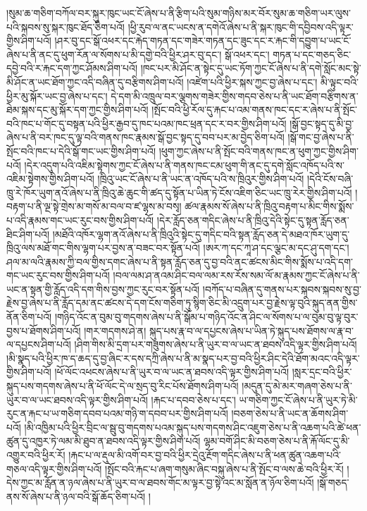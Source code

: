 །སུམ་ཆ་གཅིག་བཀོལ་བར་སྐུར་ཁུང་ཡང་ངོ་ཞེས་པ་ནི་རྩིག་པའི་སུམ་གཉིས་མར་བོར་སུམ་ཆ་གཅིག་ཡར་ལུས་པའི་སྐབས་སུ་སྐར་ཁུང་ཐོད་ཅིག་པའོ། །ཕྱི་རུབ་ལ་ནང་ཡངས་ན་དགེའོ་ཞེས་པ་ནི་སྐར་ཁུང་གི་དབྱིབས་འདི་ལྟར་གྱིས་ཤིག་པའོ། །ཤར་བུ་དང་སྒོ་འཕར་དང་རྐེད་གཏན་དང་གཟེར་གཏན་དང་ཟུང་དང་ར་རྐང་གི་དབྱུག་པ་ཡང་ངོ་ཞེས་པ་ནི་ནང་དུ་ཕུག་རོན་ལ་སོགས་པ་མི་དགྱེ་བའི་ཕྱིར་ཤར་བུ་དང་། སྒོ་འཕར་དང་། གཏན་པ་དང་གཅད་ཅིང་དབྱེ་བའི་ར་རྐང་དག་ཀྱང་ཤོམས་ཤིག་པའོ། །ཁང་པར་མི་ཤོང་ན་སྟེང་དུ་ཡང་ཏོག་ཀྱང་ངོ་ཞེས་པ་ནི་དགེ་སློང་མང་སྟེ་མི་ཤོང་ན་ཡང་ཐོག་ཀྱང་འདི་བཞིན་དུ་བརྩིགས་ཤིག་པའོ། །འཛེག་པའི་ཕྱིར་སྐས་ཀྱང་བྱ་ཞེས་པ་དང་། མི་ལྟུང་བའི་ཕྱིར་མུ་སྐོར་ཡང་བྱ་ཞེས་པ་དང་། དེ་དག་མི་འཁྲུལ་བར་ལྕགས་གཟེར་གྱིས་གདབ་ཅེས་པ་ནི་ཡང་ཐོག་བརྩིགས་ན་ཐེམ་སྐས་དང་མུ་སྐོར་དག་ཀྱང་གྱིས་ཤིག་པའོ། །སྤོང་བའི་ཕྱི་རོལ་དུ་རྐང་པ་འམ་གནས་ཁང་དང་ར་ཞེས་པ་ནི་སྤོང་བའི་ཁང་པ་གོང་དུ་བསྟན་པའི་ཕྱིར་རྒྱབ་དུ་ཁང་པའམ་ཁང་ཕྲན་དང་ར་བར་གྱིས་ཤིག་པའོ། །སྒོ་བྱང་སྟད་དུ་མི་བྱ་ཞེས་པ་ནི་བར་ཁང་དུ་ལྟ་བའི་གནས་ཁང་རྣམས་སྒོ་བྱང་སྟད་དུ་བབ་པར་མ་བྱེད་ཅིག་པའོ། །སྒོ་གང་བྱ་ཞེས་པ་ནི་སྤོང་བའི་ཁང་པ་དེའི་སྒོ་གང་ཡང་གྱིས་ཤིག་པའོ། །ཕུག་ཀྱང་ཞེས་པ་ནི་སྤོང་བའི་གནས་ཁང་ན་ཕུག་ཀྱང་གྱིས་ཤིག་པའོ། །དེར་འདུག་པའི་འཇིམ་སྟེགས་ཀྱང་ངོ་ཞེས་པ་ནི་གནས་ཁང་ངམ་ཕུག་གི་ནང་དུ་དགེ་སློང་འཁོད་པའི་ས་འཇིམ་སྟེགས་གྱིས་ཤིག་པའོ། །ཁྲིའུ་ཡང་ངོ་ཞེས་པ་ནི་ཡང་ན་འཁོད་པའི་ས་ཁྲིའུར་གྱིས་ཤིག་པའོ། །དེའི་ངོས་བཞི་ཁྲུ་རེ་ཁོར་ཡུག་ནའོ་ཞེས་པ་ནི་ཁྲིའུ་ཆེ་ཆུང་གི་ཚད་དུ་སྟོན་པ་ཡིན་ཏེ་ངོས་འཇིག་ཅིང་ཡང་ཁྲུ་རེར་གྱིས་ཤིག་པའོ། །བརྟག་པ་ནི་ལྔ་སྟེ་གྲེས་མ་གསོ་མ་བལ་བ་ཛ་ལྷས་མ་བསྭ། ཚལ་རྣམས་སོ་ཞེས་པ་ནི་ཁྲིའུ་བརྟག་པ་མིང་གིས་སྨོས་པ་འདི་རྣམས་གང་ཡང་རུང་བས་གྱིས་ཤིག་པའོ། །དེར་རློད་ཅན་གདིང་ཞེས་པ་ནི་ཁྲིའུ་དེའི་སྟེང་དུ་སྟན་རློད་ཅན་ཐིང་ཤིག་པའོ། །མཐོའི་འཁོར་ལྷག་ནའོ་ཞེས་པ་ནི་ཁྲིའུའི་སྟེང་དུ་གདིང་བའི་སྟན་རློད་ཅན་དེ་མཐའ་ཁོར་ཡུག་དུ་ཁྲིའུ་ལས་མཐོ་གང་གིས་ལྷག་པར་བྱས་ན་བཟང་བར་སྟོན་པའོ། །ཨར་ཀ་དང་ཀཱ་ཤ་དང་ལྕང་མ་དང་ཤུ་དག་དང་། ཤལ་མ་ལའི་རྣམས་ཀྱི་བལ་གྱིས་དགང་ཞེས་པ་ནི་སྟན་རློད་ཅན་དུ་བྱ་བའི་ནང་ཚངས་མིང་གིས་སྨོས་པ་འདི་དག་གང་ཡང་རུང་བས་གྱིས་ཤིག་པའོ། །བལ་ལམ་ཤ་ནའམ་ཤིང་བལ་ལམ་རས་རོས་སམ་ལོ་མ་རྣམས་ཀྱང་ངོ་ཞེས་པ་ནི་ཡང་ན་སྟན་གྱི་རློད་འདི་དག་གིས་བྱས་ཀྱང་རུང་བར་སྟོན་པའོ། །བཀོད་པ་བཞིན་དུ་གནས་པར་སྐབས་སྐབས་སུ་བྱ་རྗེས་བྱ་ཞེས་པ་ནི་རློད་དམ་ནང་ཚངས་དེ་དག་ངོས་གཅིག་ཏུ་སྙིག་ཅིང་མི་འདྲུག་པར་བྱ་རྗེས་ལྟ་བུའི་སྐུད་ནན་གྱིས་ནོན་ཅིག་པའོ། །གཉིད་འོང་ན་བུམ་བུ་གདགས་ཞེས་པ་ནི་སྒོམ་པ་གཉིད་འོང་ན་ཤིང་ལ་སོགས་པ་ལ་བུམ་བུ་ལྟ་བུར་བྱས་པ་ཐོགས་ཤིག་པའོ། །གར་གདགས་ཤེ་ན། སྐུད་པས་རྣ་བ་ལ་དཔྱངས་ཞེས་པ་ཡིན་ཏེ་སྐུད་པས་ཐོགས་ལ་རྣ་བ་ལ་དཔྱངས་ཤིག་པའོ། །ཤིག་གིས་མི་དྲག་པར་གཟུགས་ཞེས་པ་ནི་ཡུར་བ་ལ་ཡང་ན་ཐབས་འདི་ལྟར་གྱིས་ཤིག་པའོ། །མི་སྣད་པའི་ཕྱིར་ཁ་ད་ཆད་དུ་བྱ་ཞིང་ར་དས་དཀྲི་ཞེས་པ་ནི་མ་སྣད་པར་བྱ་བའི་ཕྱིར་ཤིང་དེའི་ཐོག་མའང་འདི་ལྟར་གྱིས་ཤིག་པའོ། །ཕོ་ལོང་འཕངས་ཞེས་པ་ནི་ཡུར་བ་ལ་ཡང་ན་ཐབས་འདི་ལྟར་གྱིས་ཤིག་པའོ། །སླར་དྲང་བའི་ཕྱིར་སྐུད་པས་གདགས་ཞེས་པ་ནི་ཕོ་ལོང་དེ་ལ་སྲད་བུ་རིང་པོས་ཐོགས་ཤིག་པའོ། །མདུན་དུ་མེ་མར་གཞག་ཅེས་པ་ནི་ཡུར་བ་ལ་ཡང་ཐབས་འདི་ལྟར་གྱིས་ཤིག་པའོ། །རྐང་པ་དབབ་ཅེས་པ་དང་། ཡ་གཅིག་ཀྱང་ངོ་ཞེས་པ་ནི་ཡུར་ཏེ་མི་རུང་ན་རྐང་པ་ཡ་གཅིག་དབབ་པའམ་གཉི་ག་དབབ་པར་གྱིས་ཤིག་པའོ། །བཅག་ཅེས་པ་ནི་ཡང་ན་ཆོགས་ཤིག་པའོ། །མི་འཁྱིམ་པའི་ཕྱིར་བྲིང་ལ་སྦུ་བུ་གདགས་པའམ་སྐུད་པས་གདགས་ཤིང་འཇུག་ཅེས་པ་ནི་འཆག་པའི་ཚེ་ཕན་ཚུན་དུ་འཁྱར་ཏེ་ལམ་མི་ཐུབ་ན་ཐབས་འདི་ལྟར་གྱིས་ཤིག་པའོ། ལྷམ་བགོ་ཤིང་མི་བཅག་ཅེས་པ་ནི་རྐོ་ལོང་དུ་མི་འགྱུར་བའི་ཕྱིར་རོ། །རྐང་པ་ལ་རྡུལ་མི་འགོ་བར་བྱ་བའི་ཕྱིར་དྲེའུ་རྔོག་གདིང་ཞེས་པ་ནི་ཕན་ཚུན་འཆག་པའི་གཅལ་འདི་ལྟར་གྱིས་ཤིག་པའོ། །སྤོང་བའི་རྐང་པ་ཞག་གསུམ་ཞིང་བསྐུ་ཞེས་པ་ནི་སྤོང་བ་ལས་ཆེ་བའི་ཕྱིར་རོ། །དེས་ཀྱང་མ་རློན་ན་ཉལ་ཞེས་པ་ནི་ཡུར་བ་ལ་ཐབས་གོང་མ་ལྟར་བྱ་སྟེ་འང་མ་སློན་ན་ཉོལ་ཅིག་པའོ། །སྒོ་གཅད་ནས་སོ་ཞེས་པ་ནི་ཉལ་བའི་སྒོ་ཆོད་ཅིག་པའོ། །
